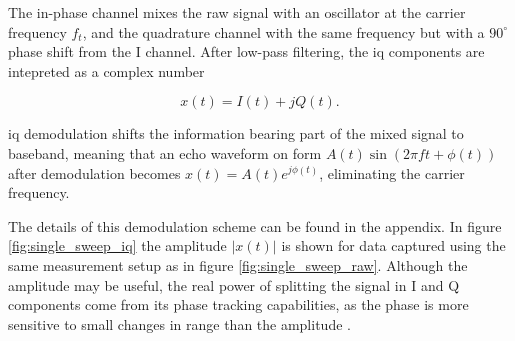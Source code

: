 The in-phase channel mixes the raw signal with an oscillator at the carrier frequency $f_t$, and the quadrature channel with the same frequency but with a $90^\circ$ phase shift from the I channel. After low-pass filtering, the \gls{iq} components are intepreted as a complex number

\begin{equation}
	x(t) = I(t) + jQ(t).
\end{equation}

\gls{iq} demodulation shifts the information bearing part of the mixed signal to baseband, meaning that an echo waveform on form $A(t)\sin(2\pi f t + \phi(t))$ after demodulation becomes $x(t) = A(t)e^{j\phi(t)}$, eliminating the carrier frequency. 

The details of this demodulation scheme can be found in the appendix. In figure \ref{fig:single_sweep_iq} the amplitude $|x(t)|$ is shown for data captured using the same measurement setup as in figure \ref{fig:single_sweep_raw}. Although the amplitude may be useful, the real power of splitting the signal in I and Q components come from its phase tracking capabilities, as the phase is more sensitive to small changes in range than the amplitude \citep{lien_gillian_karagozler_amihood_schwesig_olson_raja_poupyrev_2016}.





